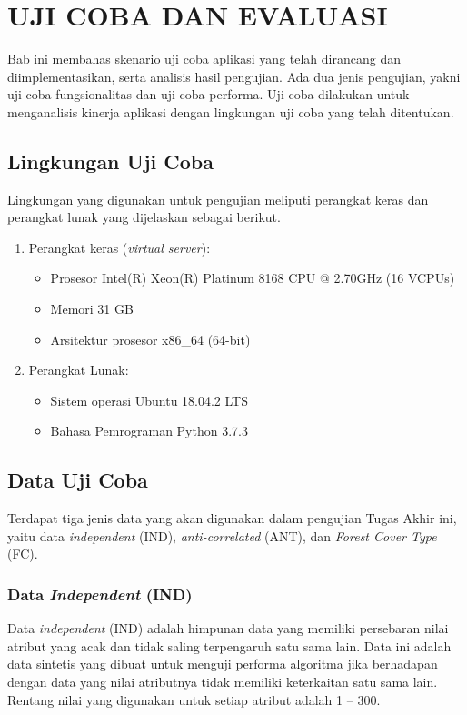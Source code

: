\chapter{UJI COBA DAN EVALUASI}\label{chap:uji-coba-eval}

\tab Bab ini membahas skenario uji coba aplikasi yang telah dirancang dan diimplementasikan, serta analisis hasil pengujian. Ada dua jenis pengujian, yakni uji coba fungsionalitas dan uji coba performa. Uji coba dilakukan untuk menganalisis kinerja aplikasi dengan lingkungan uji coba yang telah ditentukan.

\section{Lingkungan Uji Coba}
\tab Lingkungan yang digunakan untuk pengujian meliputi perangkat keras dan
perangkat lunak yang dijelaskan sebagai berikut.

\begin{enumerate}
	\item Perangkat keras (\textit{virtual server}):
	\begin{itemize}
		\item Prosesor Intel(R) Xeon(R) Platinum 8168 CPU @ 2.70GHz (16 VCPUs)
		\item Memori 31 GB
		\item Arsitektur prosesor x86\_64 (64-bit)
	\end{itemize}
	\item Perangkat Lunak:
	\begin{itemize}
		\item Sistem operasi Ubuntu 18.04.2 LTS
		\item Bahasa Pemrograman Python 3.7.3
	\end{itemize}			
\end{enumerate}

\section{Data Uji Coba}

\tab Terdapat tiga jenis data yang akan digunakan dalam pengujian Tugas Akhir ini, yaitu data \textit{independent} (IND), \textit{anti-correlated} (ANT), dan \textit{Forest Cover Type} (FC).

\pagebreak
\subsection{Data \textit{Independent} (IND)}
\tab Data \textit{independent} (IND) adalah himpunan data yang memiliki persebaran nilai atribut yang acak dan tidak saling terpengaruh satu sama lain. Data ini adalah data sintetis yang dibuat untuk menguji performa algoritma jika berhadapan dengan data yang nilai atributnya tidak memiliki keterkaitan satu sama lain. Rentang nilai yang digunakan untuk setiap atribut adalah 1 – 300.

